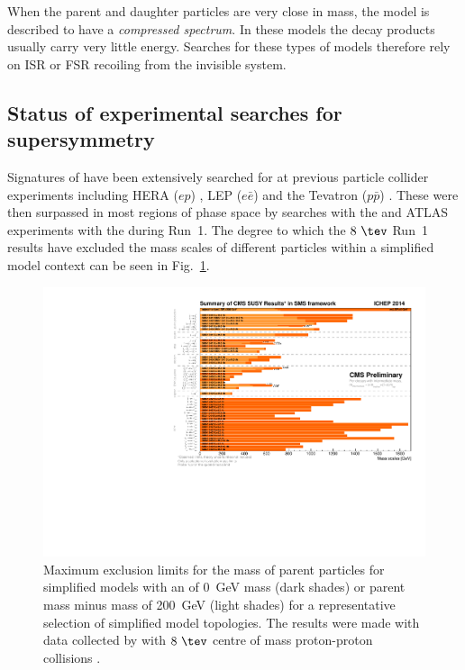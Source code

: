 When the parent and
daughter particles are very close in mass, the model is described to
have a \emph{compressed spectrum}. In these models the \SM decay
products usually carry very little energy. Searches for these types of
models therefore rely on \acf{ISR} or \acf{FSR} recoiling from the
invisible \SUSY system.

\subsection{Status of experimental searches for supersymmetry}

Signatures of \SUSY have been extensively searched for at previous
particle collider experiments including HERA ($ep$)
\cite{Aid:1996es,Butterworth:1992tc}, LEP ($e\bar{e}$)
\cite{Braibant:2003px} and the Tevatron ($p\bar{p}$)
\cite{Jaffre:2012gx}. These were then surpassed in most regions of
phase space by searches with the \CMS and ATLAS experiments with the
\LHC during Run~1. The degree
to which the $8~\tev$ Run~1 results have excluded the mass scales of
different \SUSY particles within a simplified model context can be
seen in Fig.~\ref{fig:run1Exclusion}.

\begin{figure}
  \includegraphics[width=1.0\linewidth]{figs/run1SusyExclusion}
  \caption[]%
  {Maximum exclusion limits for the mass of \SUSY parent particles for
  simplified models with an \LSP of 0~GeV mass (dark shades) or
  parent mass minus \LSP mass of 200~GeV (light shades) for a
  representative selection of simplified model topologies. The results
  were made with data collected by \CMS with $8~\tev$ centre of mass
  proton-proton collisions \cite{smsTwiki}.}%
  \label{fig:run1Exclusion}
\end{figure}

